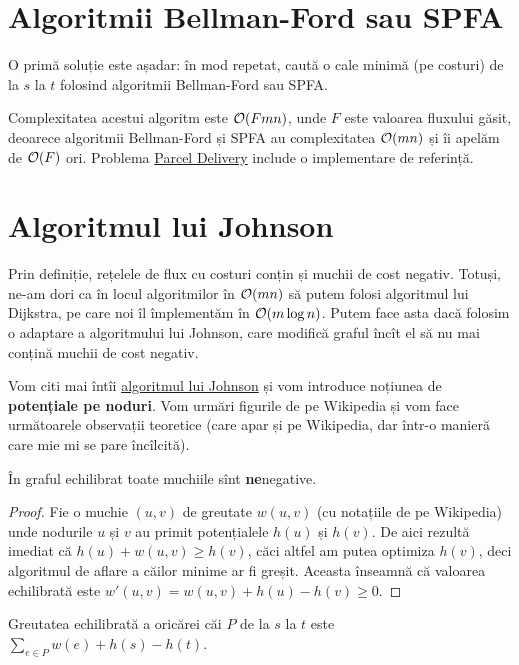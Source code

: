 \documentclass[../main.tex]{subfiles}
\begin{document}
\section{Algoritmii Bellman-Ford sau SPFA}

O primă soluție este așadar: în mod repetat, caută o cale minimă (pe costuri) de la $s$ la $t$ folosind algoritmii Bellman-Ford sau SPFA.

Complexitatea acestui algoritm este $\mathcal{O}(Fmn)$, unde $F$ este valoarea fluxului găsit, deoarece algoritmii Bellman-Ford și SPFA au complexitatea $\mathcal{O}(mn)$ și îi apelăm de $\mathcal{O}(F)$ ori. Problema \hyperref[problem:parcel-delivery]{Parcel Delivery} include o implementare de referință.


\section{Algoritmul lui Johnson}

Prin definiție, rețelele de flux cu costuri conțin și muchii de cost negativ. Totuși, ne-am dori ca în locul algoritmilor în $\mathcal{O}(mn)$ să putem folosi algoritmul lui Dijkstra, pe care noi îl împlementăm în $\mathcal{O}(m \log n)$. Putem face asta dacă folosim o adaptare a algoritmului lui Johnson, care modifică graful încît el să nu mai conțină muchii de cost negativ.

Vom citi mai întîi \href{https://en.wikipedia.org/wiki/Johnson\%27s_algorithm}{algoritmul lui Johnson} și vom introduce noțiunea de \textbf{potențiale pe noduri}. Vom urmări figurile de pe Wikipedia și vom face următoarele observații teoretice (care apar și pe Wikipedia, dar într-o manieră care mie mi se pare încîlcită).

\begin{remark}
  În graful echilibrat toate muchiile sînt \textbf{ne}negative.
\end{remark}

\begin{proof}
  Fie o muchie $(u, v)$ de greutate $w(u, v)$ (cu notațiile de pe Wikipedia) unde nodurile $u$ și $v$ au primit potențialele $h(u)$ și $h(v)$. De aici rezultă imediat că $h(u) + w(u, v) \geq h(v)$, căci altfel am putea optimiza $h(v)$, deci algoritmul de aflare a căilor minime ar fi greșit. Aceasta înseamnă că valoarea echilibrată este $w'(u,v) = w(u, v) + h(u) - h(v) \geq 0$.
\end{proof}

\begin{remark}
  Greutatea echilibrată a oricărei căi $P$ de la $s$ la $t$ este $\sum_{e \in P} w(e) + h(s) - h(t)$.
\end{remark}
\end{document}
